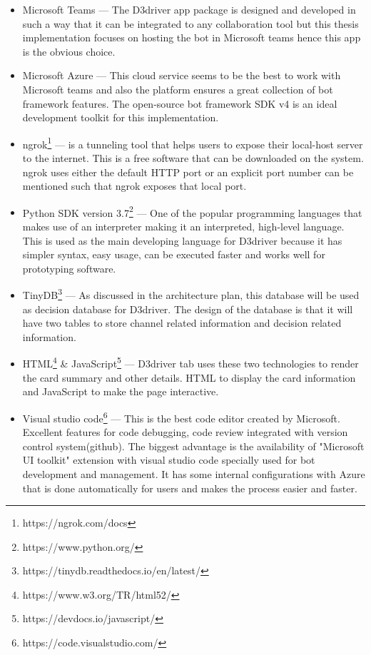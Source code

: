 \begin{itemize}
\item  Microsoft Teams --- The D3driver app package is designed and developed in such a way that it can be integrated to any collaboration tool but this thesis implementation focuses on hosting the bot in Microsoft teams hence this app is the obvious choice.

\item  Microsoft Azure --- This cloud service seems to be the best to work with Microsoft teams and also the platform ensures a great collection of bot framework features. The open-source bot framework SDK v4 is an ideal development toolkit for this implementation.

\item ngrok\footnote{https://ngrok.com/docs} --- is a tunneling tool that helps users to expose their local-host server to the internet. This is a free software that can be downloaded on the system. ngrok uses either the default HTTP port or an explicit port number can be mentioned such that ngrok exposes that local port.

\item Python SDK version 3.7\footnote{https://www.python.org/} --- One of the popular programming languages that makes use of an interpreter making it an interpreted, high-level language. This is used as the main developing language for D3driver because it has simpler syntax, easy usage, can be executed faster and works well for prototyping software.

\item TinyDB\footnote{https://tinydb.readthedocs.io/en/latest/} --- As discussed in the architecture plan, this database will be used as decision database for D3driver. The design of the database is that it will have two tables to store channel related information and decision related information.

\item  HTML\footnote{https://www.w3.org/TR/html52/} \& JavaScript\footnote{https://devdocs.io/javascript/} --- D3driver tab uses these two technologies to render the card summary and other details. HTML to display the card information and JavaScript to make the page interactive.

\item  Visual studio code\footnote{https://code.visualstudio.com/} --- This is the best code editor created by Microsoft. Excellent features for code debugging, code review integrated with version control system(github). The biggest advantage is the availability of "Microsoft UI toolkit" extension with visual studio code specially used for bot development and management. It has some internal configurations with Azure that is done automatically for users and makes the process easier and faster.
\end{itemize}


